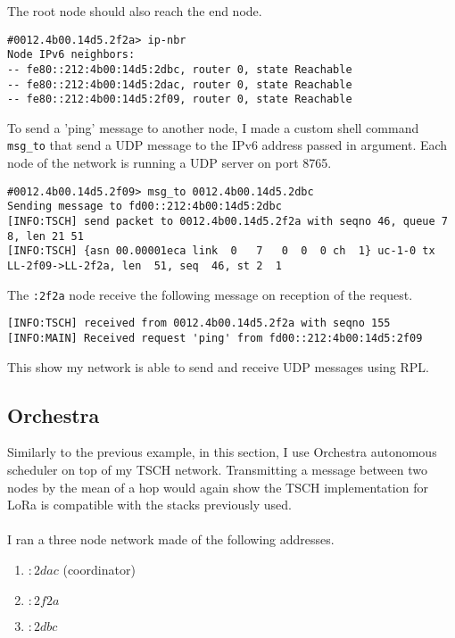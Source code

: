 The root node should also reach the end node.

\begin{lstlisting}[language=none]
#0012.4b00.14d5.2f2a> ip-nbr
Node IPv6 neighbors:
-- fe80::212:4b00:14d5:2dbc, router 0, state Reachable 
-- fe80::212:4b00:14d5:2dac, router 0, state Reachable 
-- fe80::212:4b00:14d5:2f09, router 0, state Reachable 
\end{lstlisting}

To send a 'ping' message to another node, I made a custom shell 
command \lstinline{msg_to} that send a UDP message to the IPv6 address 
passed in argument.
Each node of the network is running a UDP server on port 8765.

\begin{lstlisting}[language=none]
#0012.4b00.14d5.2f09> msg_to 0012.4b00.14d5.2dbc
Sending message to fd00::212:4b00:14d5:2dbc
[INFO:TSCH] send packet to 0012.4b00.14d5.2f2a with seqno 46, queue 7 8, len 21 51
[INFO:TSCH] {asn 00.00001eca link  0   7   0  0  0 ch  1} uc-1-0 tx LL-2f09->LL-2f2a, len  51, seq  46, st 2  1
\end{lstlisting}

The \lstinline{:2f2a} node receive the following message on reception of the
request.

\begin{lstlisting}[language=none]
[INFO:TSCH] received from 0012.4b00.14d5.2f2a with seqno 155
[INFO:MAIN] Received request 'ping' from fd00::212:4b00:14d5:2f09
\end{lstlisting}

This show my network is able to send and receive UDP messages using RPL.

\subsection{Orchestra}

Similarly to the previous example, in this section, I use Orchestra autonomous
scheduler on top of my TSCH network.
Transmitting a message between two nodes by the mean of a hop would again show
the TSCH implementation for LoRa is compatible with the stacks previously used.

\paragraph{}

I ran a three node network made of the following addresses.

\begin{enumerate}
  \item $:2dac$ (coordinator)
  \item $:2f2a$
  \item $:2dbc$
\end{enumerate}

